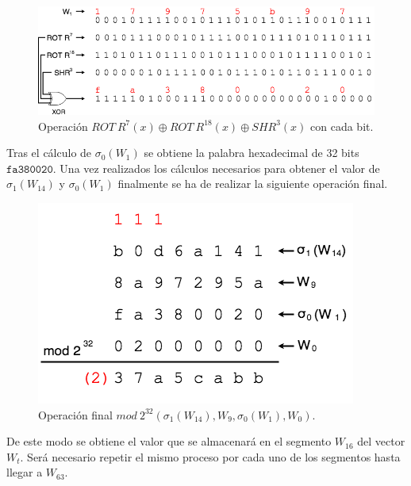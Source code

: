 \documentclass{article}
\begin{document}
    \begin{figure}[H]
    \centering
        \includegraphics[scale=0.445]{img/SHA-256-Wt_operacion_sigma0.png}
        \caption{Operación $ROT \ R^{7}(x) \oplus ROT \ R^{18}(x) \oplus SHR^{3}(x)$ con cada bit.}
    \end{figure}
    
    Tras el cálculo de $\sigma_{0}(W_{1})$ se obtiene la palabra hexadecimal de 32 bits $\texttt{fa380020}$. Una vez realizados los cálculos necesarios para obtener el valor de $\sigma_{1}(W_{14})$ y $\sigma_{0}(W_{1})$ finalmente se ha de realizar la siguiente operación final.
    
    \begin{figure}[H]
    \centering
        \includegraphics[scale=0.445]{img/SHA-256-Wt_operacion_mod2_32_final.png}
        \caption{Operación final $mod \ 2^{32} (\sigma_{1}(W_{14}), W_{9}, \sigma_{0}(W_{1}), W_{0})$.}
    \end{figure}
    
    De este modo se obtiene el valor que se almacenará en el segmento $W_{16}$ del vector $W_t$. Será necesario repetir el mismo proceso por cada uno de los segmentos hasta llegar a $W_{63}$.
    
    \vspace{3mm}
    
\end{document}
